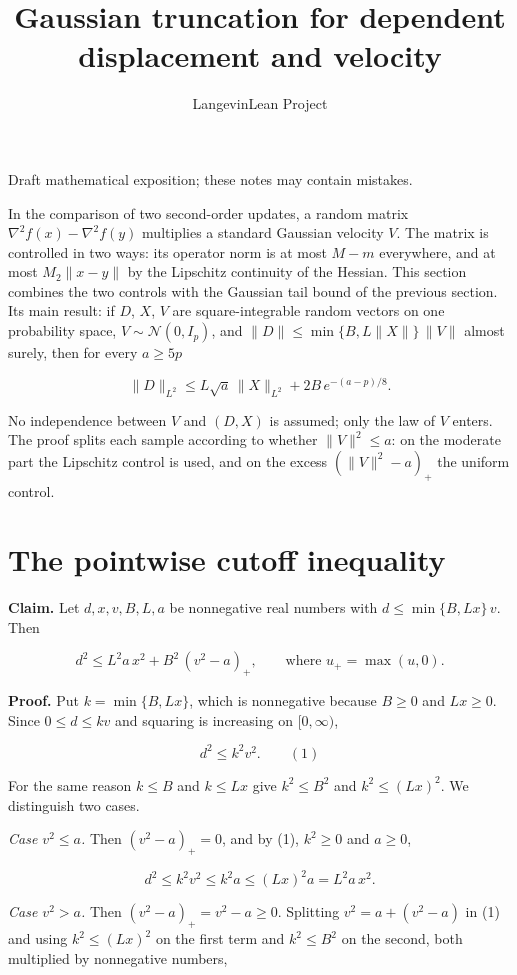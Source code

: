 \documentclass[11pt,a4paper]{article}
\title{\texorpdfstring{Gaussian truncation for dependent displacement and velocity}{Gaussian truncation for dependent displacement and velocity}}
\author{LangevinLean Project}
\date{}
\begin{document}
\maketitle
Draft mathematical exposition; these notes may contain mistakes.


In the comparison of two second-order updates, a random matrix \(\nabla^2f(x)-\nabla^2f(y)\) multiplies a standard Gaussian velocity \(V\). The matrix is controlled in two ways: its operator norm is at most \(M-m\) everywhere, and at most \(M_2\|x-y\|\) by the Lipschitz continuity of the Hessian. This section combines the two controls with the Gaussian tail bound of the previous section. Its main result: if \(D\), \(X\), \(V\) are square-integrable random vectors on one probability space, \(V\sim\mathcal N(0,I_p)\), and \(\|D\|\le\min\{B,L\|X\|\}\,\|V\|\) almost surely, then for every \(a\ge5p\)


\[\|D\|_{L^2}\le L\sqrt a\,\|X\|_{L^2}+2B\,e^{-(a-p)/8}.\]


No independence between \(V\) and \((D,X)\) is assumed; only the law of \(V\) enters. The proof splits each sample according to whether \(\|V\|^2\le a\): on the moderate part the Lipschitz control is used, and on the excess \((\|V\|^2-a)_+\) the uniform control.


\section{\texorpdfstring{The pointwise cutoff inequality}{The pointwise cutoff inequality}}


\textbf{Claim.} Let \(d,x,v,B,L,a\) be nonnegative real numbers with \(d\le\min\{B,Lx\}\,v\). Then


\[d^2\le L^2a\,x^2+B^2\,(v^2-a)_+,\qquad\text{where }u_+=\max(u,0).\]


\textbf{Proof.} Put \(k=\min\{B,Lx\}\), which is nonnegative because \(B\ge0\) and \(Lx\ge0\). Since \(0\le d\le kv\) and squaring is increasing on \([0,\infty)\),


\[d^2\le k^2v^2.\qquad(1)\]


For the same reason \(k\le B\) and \(k\le Lx\) give \(k^2\le B^2\) and \(k^2\le(Lx)^2\). We distinguish two cases.




\emph{Case \(v^2\le a\).} Then \((v^2-a)_+=0\), and by (1), \(k^2\ge0\) and \(a\ge0\),


\[d^2\le k^2v^2\le k^2a\le(Lx)^2a=L^2a\,x^2.\]


\emph{Case \(v^2>a\).} Then \((v^2-a)_+=v^2-a\ge0\). Splitting \(v^2=a+(v^2-a)\) in (1) and using \(k^2\le(Lx)^2\) on the first term and \(k^2\le B^2\) on the second, both multiplied by nonnegative numbers,
\end{document}

